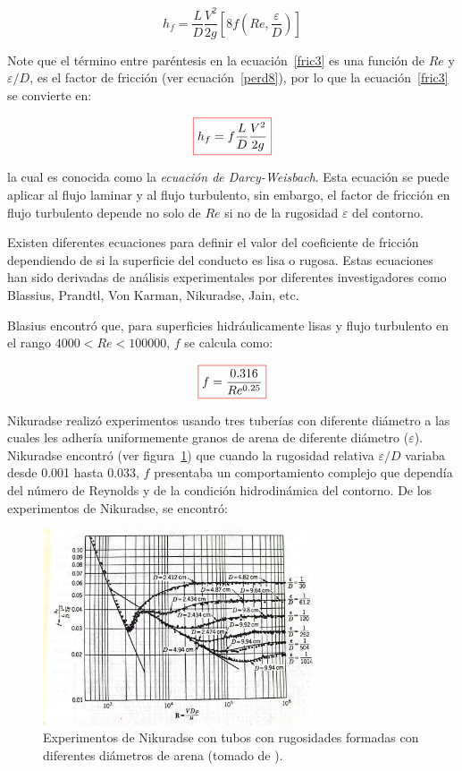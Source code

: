 \documentclass[11pt, oneside]{article}
\begin{document}
\begin{equation}
h_f = \frac{L}{D}\frac{V^2}{2g} \left[8 f \left(Re , \frac{\varepsilon}{D} \right) \right]
\label{fric3}
\end{equation}

Note que el t\'ermino entre par\'entesis en la ecuaci\'on~\ref{fric3} es una funci\'on de $Re$ y $\varepsilon/D$, es el factor de fricci\'on (ver ecuaci\'on~\ref{perd8}), por lo que la ecuaci\'on~\ref{fric3} se convierte en:

\begin{equation}
\color{red}\boxed{\color{black} h_f = f \frac{L}{D} \frac{V^2}{2g}}
\label{fric4}
\end{equation}

la cual es conocida como la \emph{ecuaci\'on de Darcy-Weisbach}. Esta ecuaci\'on se puede aplicar al flujo laminar y al flujo turbulento, sin embargo, el factor de fricci\'on en flujo turbulento depende no solo de $Re$ si no de la rugosidad $\varepsilon$ del contorno.

Existen diferentes  ecuaciones para definir el valor del coeficiente de fricci\'on dependiendo de si la superficie del conducto es lisa o rugosa. Estas ecuaciones han sido derivadas de an\'alisis experimentales por diferentes investigadores como Blassius, Prandtl, Von Karman, Nikuradse, Jain, etc.

Blasius encontr\'o que, para superficies hidr\'aulicamente lisas y flujo turbulento en el rango $4000 < Re < 100000$, $f$ se calcula como:

\begin{equation}
\color{red}\boxed{\color{black} f = \frac{0.316}{Re^{0.25}} }
\label{fric5}
\end{equation}

Nikuradse realiz\'o experimentos usando tres tuber\'ias con diferente di\'ametro a las cuales les adher\'ia uniformemente granos de arena de diferente di\'ametro ($\varepsilon$). Nikuradse encontr\'o (ver figura~\ref{nikur}) que cuando la rugosidad relativa $\varepsilon/D$ variaba desde 0.001 hasta 0.033, $f$ presentaba un comportamiento complejo que depend\'ia del n\'umero de Reynolds y de la condici\'on hidrodin\'amica del contorno. De los experimentos de Nikuradse, se encontr\'o:

\begin{figure}[h]
\centering
\includegraphics[width=8cm]{nikur.jpeg}
\caption{Experimentos de Nikuradse con tubos con rugosidades formadas con diferentes di\'ametros de arena (tomado de \cite{streeter}).}
\label{nikur}
\end{figure}
\end{document}
